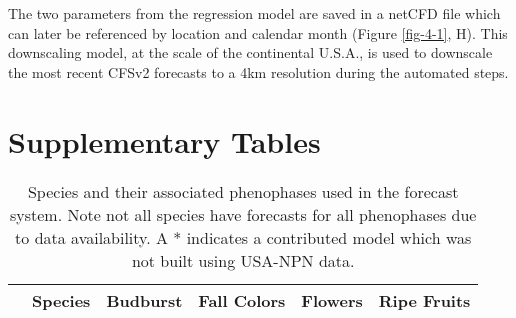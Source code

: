 The two parameters from the regression model are saved in a netCFD file which can later be referenced by location and calendar month (Figure \ref{fig-4-1}, H). This downscaling model, at the scale of the continental U.S.A., is used to downscale the most recent CFSv2 forecasts to a 4km resolution during the automated steps. 

\newpage

\section{Supplementary Tables}

\begin{table}
    \caption[Species and their associated phenophases used in the forecast system]{Species and their associated phenophases used in the forecast system. Note not all species have forecasts for all phenophases due to data availability. A * indicates a contributed model which was not built using USA-NPN data.}
    \label{table-c-1}
\begin{tabularx}{\textwidth}{p{0.5cm}XXXXX}
\hline
& Species & Budburst & Fall Colors & Flowers & Ripe Fruits\\
\hline


\end{tabularx}
\end{table}
